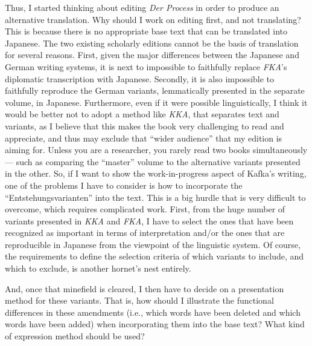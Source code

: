 \begin{paper}
Thus, I started thinking about editing \emph{Der Process} in order to
produce an alternative translation. Why should I work on editing first,
and not translating? This is because there is no appropriate base text
that can be translated into Japanese. The two existing scholarly
editions cannot be the basis of translation for several reasons. First, given the major differences between the Japanese and German
writing systems, it is next to impossible to faithfully replace
\emph{FKA}'s diplomatic transcription with Japanese. Secondly, it is
also impossible to faithfully reproduce the German variants,
lemmatically presented in the separate volume, in Japanese. Furthermore, even
if it were possible linguistically, I think it would be better not to
adopt a method like \emph{KKA}, that separates text and variants, as I
believe that this makes the book very challenging to read and
appreciate, and thus may exclude that ``wider audience'' that my edition
is aiming for. Unless you are a researcher, you rarely read two books
simultaneously –– such as comparing the ``master'' volume to the
alternative variants presented in the other. So, if I want to show the
work-in-progress aspect of Kafka's writing, one of the problems I have
to consider is how to incorporate the ``Entstehungsvarianten'' into the
text. This is a big hurdle that is very difficult to overcome, which
requires complicated work. First, from the huge
number of variants presented in \emph{KKA} and \emph{FKA}, I have to
select the ones that have been recognized as important in terms of
interpretation and/or the ones that are reproducible in Japanese from
the viewpoint of the linguistic system. Of course, the requirements to
define the selection criteria of which variants to include, and
which to exclude, is another hornet's nest entirely.

And, once that minefield is cleared, I then have to decide on a
presentation method for these variants. That is, how should I illustrate
the functional differences in these amendments (i.e., which words have
been deleted and which words have been added) when incorporating them
into the base text? What kind of expression method should be used?


\end{paper}
